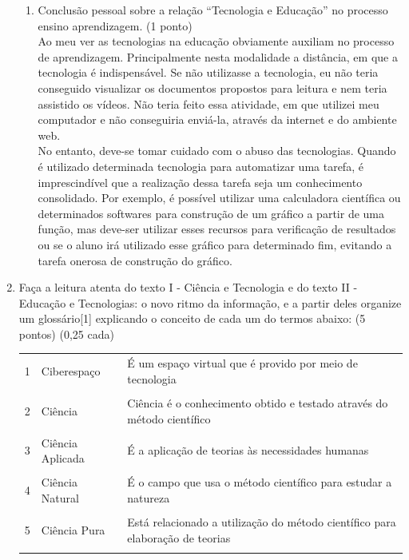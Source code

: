 \documentclass[a4paper, 12pt]{article}
\begin{document}
\begin{enumerate}
\begin{enumerate}
  \item Conclusão pessoal sobre a relação “Tecnologia e Educação” no processo ensino aprendizagem. (1 ponto) \\
    Ao meu ver as tecnologias na educação obviamente auxiliam no processo de aprendizagem. Principalmente nesta modalidade a distância, em que a tecnologia é indispensável. Se não utilizasse a tecnologia, eu não teria conseguido visualizar os documentos propostos para leitura e nem teria assistido os vídeos. Não teria feito essa atividade, em que utilizei meu computador e não conseguiria enviá-la, através da internet e do ambiente web. \\
    No entanto, deve-se tomar cuidado com o abuso das tecnologias. Quando é utilizado determinada tecnologia para automatizar uma tarefa, é imprescindível que a realização dessa tarefa seja um conhecimento consolidado. Por exemplo, é possível utilizar uma calculadora científica ou determinados softwares para construção de um gráfico a partir de uma função, mas deve-ser utilizar esses recursos para verificação de resultados ou se o aluno irá utilizado esse gráfico para determinado fim, evitando a tarefa onerosa de construção do gráfico.
  \end{enumerate}
  \item Faça a leitura atenta do texto I  - Ciência e  Tecnologia e   do texto II -  Educação e Tecnologias: o novo ritmo da informação,   e a partir deles organize um glossário[1] explicando o conceito de cada um do termos abaixo: (5 pontos) (0,25 cada) \\
    \begin{tabular}{|m{0.5cm}|m{5cm}|m{8cm}|}
      \hline
      1 & Ciberespaço & É um espaço virtual que é provido por meio de tecnologia  \\ \\
      \hline
      2 & Ciência & Ciência é o conhecimento obtido e testado através do método científico \\ \\
      \hline
      3 & Ciência Aplicada & É a aplicação de teorias às necessidades humanas \\ \\
      \hline
      4 & Ciência Natural & É o campo que usa o método científico para estudar a natureza \\ \\
      \hline
      5 & Ciência Pura & Está relacionado a utilização do método científico para elaboração de teorias \\ \\

\end{tabular}
\end{enumerate}
\end{document}
